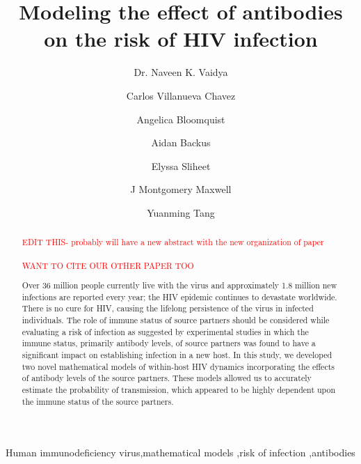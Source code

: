 \documentclass[]{elsarticle}
\theoremstyle{definition}
\begin{document}
\begin{frontmatter}

\title{Modeling the effect of antibodies on the risk of HIV infection}




\author[nav/ang]{Dr. Naveen K. Vaidya}
\author[carlos]{Carlos Villanueva Chavez}
\author[nav/ang]{Angelica Bloomquist }
\author[aidan]{Aidan Backus}
\author[elyssa]{Elyssa Sliheet}
\author[J]{J Montgomery Maxwell}
\author[yuanming]{Yuanming Tang}

\address[nav/ang]{San Diego State University}
\address[carlos]{University of Oklahoma}
\address[aidan]{Brown University}
\address[elyssa]{Southwestern University}
\address[yuanming]{University of California, Berkeley}
\address[J]{Northwestern University}


\begin{abstract}

\textcolor{red}{EDIT THIS- probably will have a new abstract with the new organization of paper \\~\\
WANT TO CITE OUR OTHER PAPER TOO}

Over 36 million people currently live with the virus and approximately 1.8 million new infections are reported every year; the HIV epidemic continues to devastate worldwide. There is no cure for HIV, causing the lifelong persistence of the virus in infected individuals. The role of immune status of source partners should be considered while evaluating a risk of infection as suggested by experimental studies in which the immune status, primarily antibody levels, of source partners was found to have a significant impact on establishing infection in a new host. In this study, we developed two novel mathematical models of within-host HIV dynamics incorporating the effects of antibody levels of the source partners. These models allowed us to accurately estimate the probability of transmission, which appeared to be highly dependent upon the immune status of the source partners.
\end{abstract}

\begin{keyword}
Human immunodeficiency virus\sep mathematical models \sep risk of infection \sep antibodies
\end{keyword}

\end{frontmatter}
\end{document}
